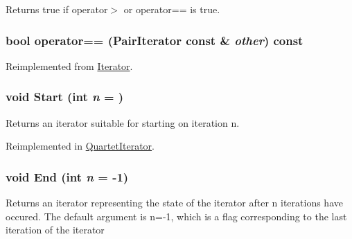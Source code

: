 Returns true if operator$>$ or operator== is true. \hypertarget{classJKBuilder_1_1PairIterator_a6b4e430066f478e5e400edd39ef93968}{
\subsubsection[{operator==}]{\setlength{\rightskip}{0pt plus 5cm}bool operator== ({\bf PairIterator} const \& {\em other}) const}}
\label{classJKBuilder_1_1PairIterator_a6b4e430066f478e5e400edd39ef93968}


Reimplemented from \hyperlink{classJKBuilder_1_1Iterator_a1ea001976a5bc8ae8dc365e2a912b59a}{Iterator}.\hypertarget{classJKBuilder_1_1Iterator_a34ca36a99b20ae3170babadaffe51ed2}{
\subsubsection[{Start}]{\setlength{\rightskip}{0pt plus 5cm}void Start (int {\em n} = {})}}
\label{classJKBuilder_1_1Iterator_a34ca36a99b20ae3170babadaffe51ed2}


Returns an iterator suitable for starting on iteration n. 

Reimplemented in \hyperlink{classJKBuilder_1_1QuartetIterator_a34ca36a99b20ae3170babadaffe51ed2}{QuartetIterator}.\hypertarget{classJKBuilder_1_1Iterator_a5f692b73d2e160450f4617bb75825e11}{
\subsubsection[{End}]{\setlength{\rightskip}{0pt plus 5cm}void End (int {\em n} = {\ttfamily -\/1})}}
\label{classJKBuilder_1_1Iterator_a5f692b73d2e160450f4617bb75825e11}


Returns an iterator representing the state of the iterator after n iterations have occured. The default argument is n=-\/1, which is a flag corresponding to the last iteration of the iterator 

